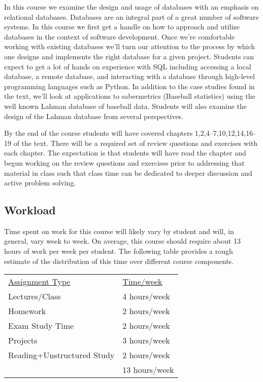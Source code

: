 \documentclass[10pt]{article}
\begin{document}
In this course we examine the design and usage of databases with an emphasis on relational databases. Databases are an integral part of a great number of software systems. In this course we first get a handle on how to approach and utilize databases in the context of software development. Once we're comfortable working with existing databases we'll turn our attention to the process by which one designs and implements the right database for a given project. Students can expect to get a lot of hands on experience with SQL including accessing a local database, a remote database, and interacting with a database through high-level programming languages such as Python.  In addition to the case studies found in the text, we'll look at applications to sabermetrics (Baseball statistics) using the well known Lahman database of baseball data. Students will also examine the design of the Lahman database from several perspectives.

By the end of the course students will have covered chapters 1,2,4--7,10,12,14,16--19 of the text.  There will be a required set of review questions and exercises with each chapter. The expectation is that students will have read the chapter and begun working on the review questions and exercises prior to addressing that material in class such that class time can be dedicated to deeper discussion and active problem solving.


\subsection{Workload}

Time spent on work for this course will likely vary by student and will, in general, vary week to week. On average, this course should require about 13 hours of work per week per student.  The following table provides a rough estimate of the distribution of this time over different course components.
\begin{center}
\begin{tabular}{ll}
\underline{Assignment Type} & \underline{Time/week} \\
Lectures/Class       & 4 hours/week \\
Homework          &  2 hours/week \\
Exam Study Time    &  2 hours/week \\
Projects          &  3 hours/week \\
Reading+Unstructured Study &  2 hours/week \\
\bottomrule
 & 13  hours/week
\end{tabular}
\end{center}
\end{document}

